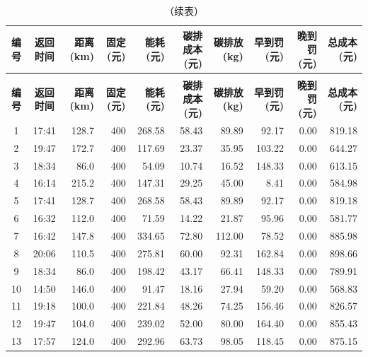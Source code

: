 \begin{landscape}
\scriptsize
\setlength{\tabcolsep}{3pt}
\begin{longtable}{|c|c|r|r|r|r|r|r|r|r|}
\caption{问题一完整调度方案（时间与成本明细，共163辆次）} \\
\hline
\rowcolor{gray!25}
\textbf{编号} & \textbf{返回时间} & \textbf{距离(km)} & \textbf{固定(元)} & \textbf{能耗(元)} & \textbf{碳排成本(元)} & \textbf{碳排放(kg)} & \textbf{早到罚(元)} & \textbf{晚到罚(元)} & \textbf{总成本(元)} \\
\hline
\endfirsthead
\caption[]{（续表）} \\
\hline
\rowcolor{gray!25}
\textbf{编号} & \textbf{返回时间} & \textbf{距离(km)} & \textbf{固定(元)} & \textbf{能耗(元)} & \textbf{碳排成本(元)} & \textbf{碳排放(kg)} & \textbf{早到罚(元)} & \textbf{晚到罚(元)} & \textbf{总成本(元)} \\
\hline
\endhead
\hline \endfoot
\hline \endlastfoot
\rowcolor{gray!8}
1 & 17:41 & 128.7 & 400 & 268.58 & 58.43 & 89.89 & 92.17 & 0.00 & 819.18 \\
\hline
2 & 19:47 & 172.7 & 400 & 117.69 & 23.37 & 35.95 & 103.22 & 0.00 & 644.27 \\
\hline
\rowcolor{gray!8}
3 & 18:34 & 86.0 & 400 & 54.09 & 10.74 & 16.52 & 148.33 & 0.00 & 613.15 \\
\hline
4 & 16:14 & 215.2 & 400 & 147.31 & 29.25 & 45.00 & 8.41 & 0.00 & 584.98 \\
\hline
\rowcolor{gray!8}
5 & 17:41 & 128.7 & 400 & 268.58 & 58.43 & 89.89 & 92.17 & 0.00 & 819.18 \\
\hline
6 & 16:32 & 112.0 & 400 & 71.59 & 14.22 & 21.87 & 95.96 & 0.00 & 581.77 \\
\hline
\rowcolor{gray!8}
7 & 16:42 & 147.8 & 400 & 334.65 & 72.80 & 112.00 & 78.52 & 0.00 & 885.98 \\
\hline
8 & 20:06 & 110.5 & 400 & 275.81 & 60.00 & 92.31 & 162.84 & 0.00 & 898.66 \\
\hline
\rowcolor{gray!8}
9 & 18:34 & 86.0 & 400 & 198.42 & 43.17 & 66.41 & 148.33 & 0.00 & 789.91 \\
\hline
10 & 14:50 & 146.0 & 400 & 91.47 & 18.16 & 27.94 & 59.20 & 0.00 & 568.83 \\
\hline
\rowcolor{gray!8}
11 & 19:18 & 100.0 & 400 & 221.84 & 48.26 & 74.25 & 156.46 & 0.00 & 826.57 \\
\hline
12 & 19:47 & 104.0 & 400 & 239.02 & 52.00 & 80.00 & 164.40 & 0.00 & 855.43 \\
\hline
\rowcolor{gray!8}
13 & 17:57 & 124.0 & 400 & 292.96 & 63.73 & 98.05 & 118.45 & 0.00 & 875.15 \\

\end{longtable}
\end{landscape}
